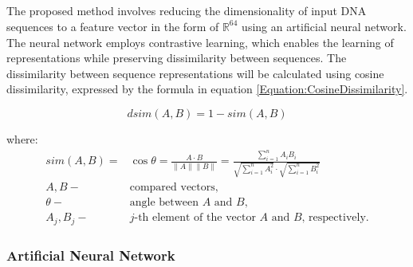\documentclass[pdflatex,sn-vancouver-num]{sn-jnl}%
\begin{document}


    \subsection{}

    The proposed method involves reducing the dimensionality of input DNA sequences to a feature vector in the form of $\mathbb{R}^{64}$ using an artificial neural network.
    The neural network employs contrastive learning, which enables the learning of representations while preserving dissimilarity between sequences.
    The dissimilarity between sequence representations will be calculated using cosine dissimilarity, expressed by the formula in equation \eqref{Equation:CosineDissimilarity}.

            \begin{equation}
                dsim(A, B) = 1 - sim(A, B)
                \label{Equation:CosineDissimilarity}
            \end{equation}

            where:
            \begin{align*}
                sim(A, B) =& \cos{\theta} = \frac{A \cdot B}{\|A\| \|B\|} = \frac{
                    \sum^{n}_{i = 1}A_i B_i
                }{
                    \sqrt{
                        \sum^{n}_{i = 1}A_i^2
                    }
                    \cdot
                    \sqrt{
                        \sum^{n}_{i = 1}B_i^2
                    }
                } \\
                A, B -& \text{compared vectors,} \\
                \theta -& \text{angle between $A$ and $B$,} \\
                A_j, B_j -& \text{$j$-th element of the vector $A$ and $B$, respectively.}
            \end{align*}

            \subsubsection{Artificial Neural Network}
\end{document}
